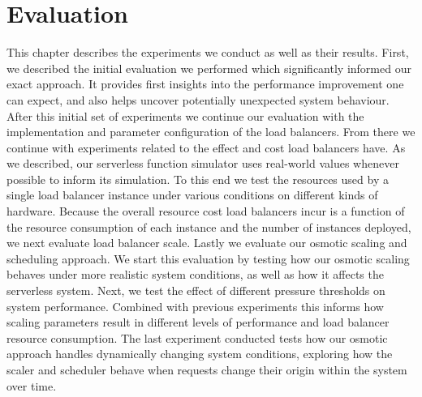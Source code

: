 \chapter{Evaluation}




This chapter describes the experiments we conduct as well as their results.
First, we described the initial evaluation we performed which significantly informed our exact approach.
It provides first insights into the performance improvement one can expect, and also helps uncover potentially unexpected system behaviour.
After this initial set of experiments we continue our evaluation with the implementation and parameter configuration of the load balancers.
From there we continue with experiments related to the effect and cost load balancers have.
As we described, our serverless function simulator uses real-world values whenever possible to inform its simulation.
To this end we test the resources used by a single load balancer instance under various conditions on different kinds of hardware.
Because the overall resource cost load balancers incur is a function of the resource consumption of each instance and the number of instances deployed, we next evaluate load balancer scale.
Lastly we evaluate our osmotic scaling and scheduling approach.
We start this evaluation by testing how our osmotic scaling behaves under more realistic system conditions, as well as how it affects the serverless system.
Next, we test the effect of different pressure thresholds on system performance.
Combined with previous experiments this informs how scaling parameters result in different levels of performance and load balancer resource consumption.
The last experiment conducted tests how our osmotic approach handles dynamically changing system conditions, exploring how the scaler and scheduler behave when requests change their origin within the system over time.


